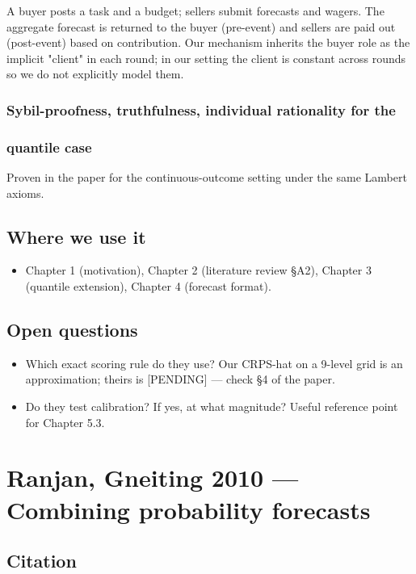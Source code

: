 \documentclass[11pt,a4paper,openany]{report}
\begin{document}
A buyer posts a task and a budget; sellers submit forecasts and
wagers. The aggregate forecast is returned to the buyer (pre-event)
and sellers are paid out (post-event) based on contribution. Our
mechanism inherits the buyer role as the implicit "client" in each
round; in our setting the client is constant across rounds so we do
not explicitly model them.

\subsection{Sybil-proofness, truthfulness, individual rationality for the}
\subsection{quantile case}

Proven in the paper for the continuous-outcome setting under the same
Lambert axioms.

\section{Where we use it}

\begin{itemize}
  \item Chapter 1 (motivation), Chapter 2 (literature review §A2),
    Chapter 3 (quantile extension), Chapter 4 (forecast format).
\end{itemize}

\section{Open questions}

\begin{itemize}
  \item Which exact scoring rule do they use? Our CRPS-hat on a 9-level grid
    is an approximation; theirs is [PENDING] — check §4 of the paper.
  \item Do they test calibration? If yes, at what magnitude? Useful
    reference point for Chapter 5.3.
\end{itemize}

\chapter{Ranjan, Gneiting 2010 — Combining probability forecasts}

\section{Citation}
\end{document}
